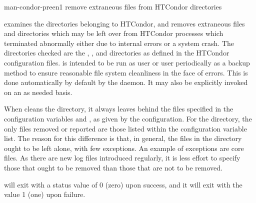 \begin{ManPage}{}{man-condor-preen}{1}
{remove extraneous files from HTCondor directories}

\Synopsis {}

\Description 

 examines the directories belonging to HTCondor, 
and removes extraneous files and directories which may be left over from
HTCondor processes which terminated abnormally either due to internal errors or
a system crash. The directories checked are 
the , , and 
directories as defined in the HTCondor configuration files.  is
intended to be run as user  or user 
periodically as a backup
method to ensure reasonable file system cleanliness in the face of
errors. This is done automatically by default by the  daemon. 
It may also be explicitly invoked on an as needed basis.

When  cleans the  directory, it always leaves
behind the files specified in the configuration variables
 and ,
as given by the configuration.
For the  directory, the only files removed or reported are those
listed within the configuration variable  list.
The reason for this difference is that, in general,
the files in the  directory ought to be left alone,
with few exceptions.
An example of exceptions are core files.
As there are new log files introduced regularly,
it is less effort to specify those that ought to be removed
than those that are not to be removed.

\begin{Options}





\end{Options}

\ExitStatus

 will exit with a status value of 0 (zero) upon success,
and it will exit with the value 1 (one) upon failure.

\end{ManPage}
